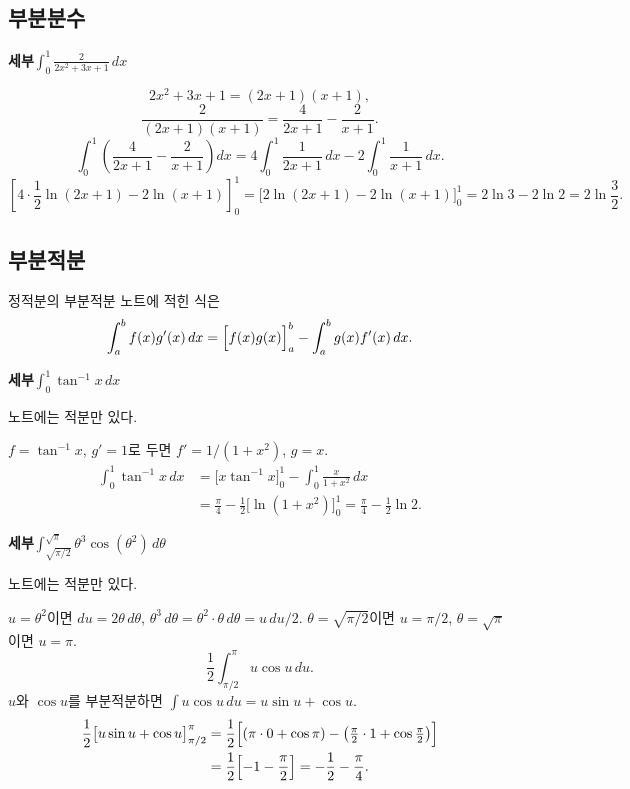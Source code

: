 \documentclass[11pt]{article}
\newcommand{\ex}[1]{\par\textbf{세부\quad #1}\par}
\begin{document}
\subsection{부분분수}

\ex{\(\displaystyle\int_{0}^{1}\frac{2}{2x^{2}+3x+1}\,dx\)}
\[
2x^{2}+3x+1=(2x+1)(x+1),
\]
\[
\frac{2}{(2x+1)(x+1)}=\frac{4}{2x+1}-\frac{2}{x+1}.
\]
\[
\int_{0}^{1}\left(\frac{4}{2x+1}-\frac{2}{x+1}\right)dx
=4\int_{0}^{1}\frac{1}{2x+1}\,dx
-2\int_{0}^{1}\frac{1}{x+1}\,dx.
\]
\[
\left[4\cdot\frac12\ln(2x+1)-2\ln(x+1)\right]_{0}^{1}
=\bigl[2\ln(2x+1)-2\ln(x+1)\bigr]_{0}^{1}
=2\ln 3-2\ln 2
=2\ln\frac{3}{2}.
\]

\subsection{부분적분}

\begin{mainbox}{정적분의 부분적분}
노트에 적힌 식은
\[
\int_{a}^{b}f(x)g'(x)\,dx
=\Bigl[f(x)g(x)\Bigr]_{a}^{b}
-\int_{a}^{b}g(x)f'(x)\,dx.
\]
\end{mainbox}

\ex{\(\displaystyle\int_{0}^{1}\tan^{-1}x\,dx\)}
노트에는 적분만 있다.

\begin{fillbox}
\(f=\tan^{-1}x\), \(g'=1\)로 두면 \(f'=1/(1+x^{2})\), \(g=x\).
\begin{align*}
\int_{0}^{1}\tan^{-1}x\,dx
&=\bigl[x\tan^{-1}x\bigr]_{0}^{1}
-\int_{0}^{1}\frac{x}{1+x^{2}}\,dx\\
&=\frac{\pi}{4}-\frac12\bigl[\ln(1+x^{2})\bigr]_{0}^{1}
=\frac{\pi}{4}-\frac12\ln 2.
\end{align*}
\end{fillbox}

\ex{\(\displaystyle\int_{\sqrt{\pi/2}}^{\sqrt{\pi}}\theta^{3}\cos(\theta^{2})\,d\theta\)}
노트에는 적분만 있다.

\begin{fillbox}
\(u=\theta^{2}\)이면 \(du=2\theta\,d\theta\), \(\theta^{3}\,d\theta=\theta^{2}\cdot\theta\,d\theta=u\,du/2\).
\(\theta=\sqrt{\pi/2}\)이면 \(u=\pi/2\), \(\theta=\sqrt{\pi}\)이면 \(u=\pi\).
\[
\frac12\int_{\pi/2}^{\pi}u\cos u\,du.
\]
\(u\)와 \(\cos u\)를 부분적분하면 \(\int u\cos u\,du=u\sin u+\cos u\).
\begin{align*}
\frac12\bigl[u\sin u+\cos u\bigr]_{\pi/2}^{\pi}
&=\frac12\Bigl[(\pi\cdot 0+\cos\pi)
-\bigl(\tfrac{\pi}{2}\cdot 1+\cos\tfrac{\pi}{2}\bigr)\Bigr]\\
&=\frac12\Bigl[-1-\frac{\pi}{2}\Bigr]
=-\frac12-\frac{\pi}{4}.
\end{align*}
\end{fillbox}
\end{document}

